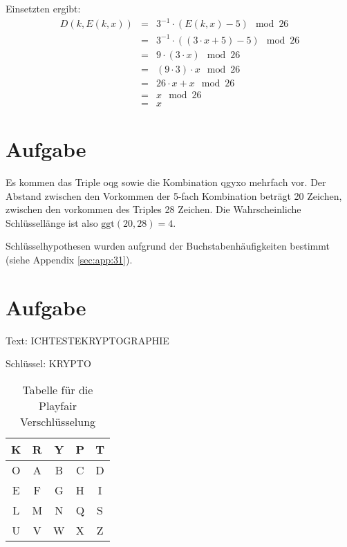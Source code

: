 \documentclass[DIN, pagenumber=false, fontsize=11pt, parskip=half]{scrartcl}
\begin{document}
\begin{enumerate}[label=(\roman*)]
            Einsetzten ergibt:
            \begin{eqnarray*}
                D(k, E(k, x)) &=& 3^{-1} \cdot (E(k, x) - 5) \mod 26\\
                    &=& 3^{-1} \cdot \left((3 \cdot x + 5) - 5 \right) \mod 26 \\
                    &=& 9 \cdot (3 \cdot x) \mod 26 \\
                    &=& (9 \cdot 3) \cdot x \mod 26 \\
                    &=& 26 \cdot x + x \mod 26 \\
                    &=& x \mod 26 \\
                    &=& x
            \end{eqnarray*}
    \end{enumerate}

    \section{Aufgabe}
    Es kommen das Triple \glqq{}oqg\grqq{} sowie die Kombination \glqq{}qgyxo\grqq{} mehrfach vor.
    Der Abstand zwischen den Vorkommen der 5-fach Kombination beträgt 20 Zeichen, zwischen den vorkommen
    des Triples 28 Zeichen. Die Wahrscheinliche Schlüssellänge ist also $\text{ggt}(20, 28) = 4$.
    
    Schlüsselhypothesen wurden aufgrund der Buchstabenhäufigkeiten bestimmt (siehe Appendix \ref{sec:app:31}).

    \section{Aufgabe}
    Text: \glqq{}ICHTESTEKRYPTOGRAPHIE\grqq{}

    Schlüssel: \glqq{}KRYPTO\grqq{}

    \begin{table}[H]
        \centering
        \begin{tabular}{|c|c|c|c|c|}
            \toprule
            K & R & Y & P & T \\
            \midrule
            O & A & B & C & D \\
            \midrule
            E & F & G & H & I \\
            \midrule
            L & M & N & Q & S \\
            \midrule
            U & V & W & X & Z \\
            \bottomrule
        \end{tabular}
        \caption{Tabelle für die Playfair Verschlüsselung}
    \end{table}
    
\end{document}
